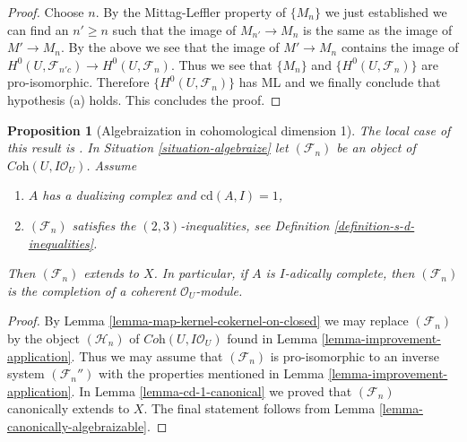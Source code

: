 \documentclass{stacks-project}
\newenvironment{reference}{\comment}{\endcomment}
\theoremstyle{plain}
\newtheorem{proposition}[subsection]{Proposition}
\theoremstyle{definition}
\theoremstyle{remark}
\numberwithin{equation}{subsection}
\begin{document}
\begin{proof}
\medskip\noindent
Choose $n$. By the Mittag-Leffler property of $\{M_n\}$ we just established
we can find an $n' \geq n$ such that the image of $M_{n'} \to M_n$
is the same as the image of $M' \to M_n$. By the above we see that
the image of $M' \to M_n$ contains the image of
$H^0(U, \mathcal{F}_{n'c}) \to H^0(U, \mathcal{F}_n)$.
Thus we see that $\{M_n\}$ and $\{H^0(U, \mathcal{F}_n)\}$
are pro-isomorphic. Therefore $\{H^0(U, \mathcal{F}_n)\}$
has ML and we finally conclude that hypothesis (a) holds.
This concludes the proof.
\end{proof}

\begin{proposition}[Algebraization in cohomological dimension 1]
\label{proposition-cd-1}
\begin{reference}
The local case of this result is \cite[IV Corollaire 2.9]{MRaynaud-book}.
\end{reference}
In Situation \ref{situation-algebraize} let $(\mathcal{F}_n)$
be an object of $\textit{Coh}(U, I\mathcal{O}_U)$. Assume
\begin{enumerate}
\item $A$ has a dualizing complex and $\text{cd}(A, I) = 1$,
\item $(\mathcal{F}_n)$ satisfies the $(2, 3)$-inequalities, see
Definition \ref{definition-s-d-inequalities}.
\end{enumerate}
Then $(\mathcal{F}_n)$ extends to $X$. In particular, if $A$ is
$I$-adically complete, then $(\mathcal{F}_n)$ is the completion
of a coherent $\mathcal{O}_U$-module.
\end{proposition}

\begin{proof}
By Lemma \ref{lemma-map-kernel-cokernel-on-closed}
we may replace $(\mathcal{F}_n)$ by the object $(\mathcal{H}_n)$
of $\textit{Coh}(U, I\mathcal{O}_U)$ found in
Lemma \ref{lemma-improvement-application}.
Thus we may assume that $(\mathcal{F}_n)$ is pro-isomorphic
to an inverse system $(\mathcal{F}_n'')$ with the properties
mentioned in Lemma \ref{lemma-improvement-application}.
In Lemma \ref{lemma-cd-1-canonical} we proved that
$(\mathcal{F}_n)$ canonically extends to $X$.
The final statement follows from Lemma \ref{lemma-canonically-algebraizable}.
\end{proof}
\end{document}
